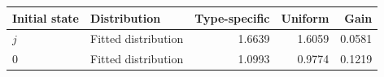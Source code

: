 \begin{tabular}{llrrr}\toprule
Initial state & Distribution & Type-specific & Uniform & Gain\\\midrule
$j$ & Fitted distribution & 1.6639 & 1.6059 & 0.0581 \\
$0$ & Fitted distribution & 1.0993 & 0.9774 & 0.1219 \\
\bottomrule\end{tabular}
